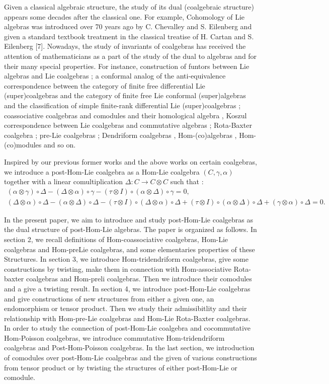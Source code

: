 \documentclass{article}
\theoremstyle{definition}
\theoremstyle{remark}
\numberwithin{equation}{section}
\begin{document}
Given a classical algebraic structure, the study of its dual (coalgebraic structure) appears some decades after the classical one. For example, Cohomology of Lie algebras was introduced over 70 years ago by C. Chevalley and S. Eilenberg
and given a standard textbook treatment in the classical treatise of H. Cartan and S. Eilenberg
[7]. Nowadays, the study of  invariants of coalgebras has received the attention of mathematicians as a part of the study of the dual to
algebras and for their many special properties. For instance, construction of funtors between Lie algebras and Lie coalgebras \cite{L}; a conformal analog of the anti-equivalence correspondence between the category of finite free differential Lie (super)coalgebras and the category of finite free Lie conformal (super)algebras and
the classification of simple finite-rank differential Lie
(super)coalgebras \cite{BL}; coassociative coalgebras and comodules and their homological algebra \cite{LP}, Koszul correspondence between Lie coalgebras and commutative algebras \cite{AL}; Rota-Baxter coalgebra \cite{R, S}; pre-Lie coalgebras \cite{S}; Dendriform coalgebras \cite{AD}, Hom-(co)algebras \cite{DY}, Hom-(co)modules and so on.


Inspired by our previous former works \cite{B1, B2} and the above works on certain coalgebras, we introduce a
post-Hom-Lie coalgebra as a Hom-Lie coalgebra $(C, \gamma, \alpha)$ together with a linear comultiplication $\Delta : C\rightarrow C\otimes C$ such that :
\begin{eqnarray}
(\alpha\otimes\gamma)\circ\Delta-(\Delta\otimes \alpha)\circ\gamma-(\tau\otimes I)\circ(\alpha\otimes\Delta)\circ\gamma=0,\hspace{4cm}\\
(\Delta\otimes \alpha)\circ\Delta\!-\!(\alpha\otimes\Delta)\circ\Delta\!-\!(\tau\otimes I)\circ(\Delta\otimes \alpha)\circ\Delta\!
+\!(\tau\otimes I)\circ(\alpha\otimes\Delta)\circ\Delta\!+\!(\gamma\otimes \alpha)\circ\Delta=0.
\end{eqnarray}

In the present paper, we aim to
introduce and study post-Hom-Lie coalgebras as the dual structure of post-Hom-Lie algebras. The paper is organized as follows.
In section 2, we recall definitions of Hom-coassociative coalgebras, Hom-Lie coalgebras and Hom-preLie coalgebras, and some elementaries properties of these Structures.
 In section 3, we introduce Hom-tridendriform coalgebras, give some constructions by twisting, make them in connection with Hom-associative Rota-baxter coalgebras and Hom-preli coalgebras. Then we introduce their comodules and a give a twisting result. In section 4, we introduce post-Hom-Lie coalgebras and give constructions of new structures from either a given one, an endomorphism or tensor product. Then we study their admissibitlity and their relationship with Hom-pre-Lie coalgebras and Hom-Lie Rota-Baxter coalgebras. In order to study the connection of post-Hom-Lie coalgebra and cocommutative Hom-Poisson coalgebras, we introduce  commutative Hom-tridendriform coalgebras and Post-Hom-Poisson coalgebras. In the last section, we introduction of comodules over post-Hom-Lie coalgebras and the given of various constructions from tensor product or by twisting the structures of either post-Hom-Lie or comodule.
\end{document}
